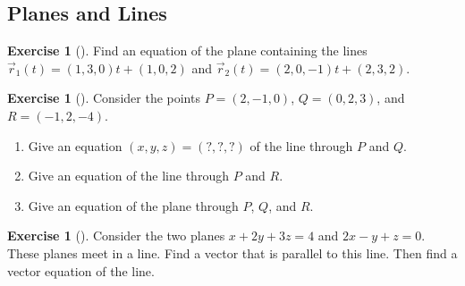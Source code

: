 \documentclass[10pt,]{book}
\theoremstyle{plain}
\theoremstyle{definition}
\theoremstyle{definition}
\theoremstyle{definition}
\theoremstyle{definition}
\newtheorem{exploration}[project]{Exercise}
\theoremstyle{definition}
\numberwithin{equation}{section}
\begin{document}
\subsection[{Planes and Lines}]{Planes and Lines}\label{subsection-13}
\begin{exploration}[]\label{plane_equation_2_lines}
Find an equation of the plane containing the lines \(\vec r_1(t)=(1,3,0)t+(1,0,2)\) and \(\vec r_2(t)=(2,0,-1)t+(2,3,2)\).%
\end{exploration}
\begin{exploration}[]\label{prob_crossproduct_normalvector}
Consider the points \(P=(2,-1,0)\), \(Q=(0,2,3)\), and \(R=(-1,2,-4)\).%
\begin{enumerate}[font=\bfseries,label=(\alph*),ref=\alph*]
\item\label{task-80} Give an equation \((x,y,z)=(?,?,?)\) of the line through \(P\) and \(Q\).%
\item\label{task-81} Give an equation of the line through \(P\) and \(R\).%
\item\label{task-82} Give an equation of the plane through \(P\), \(Q\), and \(R\).%
\end{enumerate}
\end{exploration}
\begin{exploration}[]\label{exploration-49}
Consider the two planes \(x+2y+3z=4\) and \(2x-y+z=0\). These planes meet in a line. Find a vector that is parallel to this line. Then find a vector equation of the line.%
\end{exploration}
\typeout{************************************************}
\typeout{************************************************}
\end{document}
